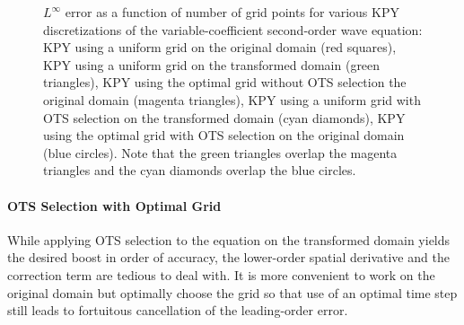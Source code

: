\documentclass[twocolumn]{article} %
\begin{document}
\begin{figure}[thb]
\begin{center}
\caption{$L^\infty$ error as a function of number of grid points for various
KPY discretizations of the variable-coefficient second-order wave equation:
KPY using a uniform grid on the original domain (red squares),
KPY using a uniform grid on the transformed domain (green triangles),
KPY using the optimal grid without OTS selection the original domain 
(magenta triangles),
KPY using a uniform grid with OTS selection on the transformed domain 
(cyan diamonds),
KPY using the optimal grid with OTS selection on the original domain 
(blue circles).  Note that the green triangles overlap the magenta triangles 
and the cyan diamonds overlap the blue circles. 
}
\label{fig:var_coef_wave_eqn_1d_error}
\end{center}
\end{figure}

\paragraph*{OTS Selection with Optimal Grid}
While applying OTS selection to the equation on the transformed domain yields the 
desired boost in order of accuracy, the lower-order spatial derivative and 
the correction term are tedious to deal with.  It is more convenient to 
work on the original domain but optimally choose the grid so that use of
an optimal time step still leads to fortuitous cancellation of the 
leading-order error.  
\end{document}
